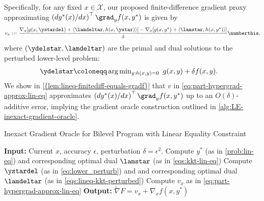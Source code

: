 Specifically, for any fixed $x\in \mathcal{X}$, our proposed finite-difference gradient proxy approximating $\left({d y^*(x)}/{dx}\right)^\top\grad_{y}f(x,y^{*})$ is given
by
 \[ v_x := {\frac{\nabla_{x}[g(x,\ystardel)+\langle\lamdeltar, h(x,\ystar)\rangle]-\nabla_{x}[g(x,y^{*})+\langle\lamstar, h(x,y^{*})\rangle]}{\delta}
 \numberthis\label{eq:part-hypergrad-approx-lin-eq},}\]
where $(\ydelstar,\lamdeltar)$ are the primal and dual solutions to the
 perturbed lower-level problem:
\begin{align}\label{eq:lower_perturb}
    & \ydelstar \coloneqq \arg\min\nolimits_{y: h(x,y) = 0} ~g(x,y)+\delta f(x,y).
\end{align} We show in \cref{{lem:lineq-finitediff-equals-gradf}} that $v$ in \cref{eq:part-hypergrad-approx-lin-eq} approximates $\left({d y^*(x)}/{dx}\right)^\top\grad_{y}f(x,y^{*})$ up to an $O(\delta)$-additive error, implying the gradient oracle construction outlined in 
\cref{alg:LE-inexact-gradient-oracle}.

\begin{algorithm}[h]\caption{Inexact Gradient Oracle for Bilevel Program with Linear Equality Constraint}\label{alg:LE-inexact-gradient-oracle}
\begin{algorithmic}[1]
\State \textbf{Input:}
Current $x$, accuracy $\epsilon$, perturbation $\delta = \epsilon^2$.
\State Compute $y^*$ (as in \cref{prob:lin-eq}) and corresponding optimal dual $\lamstar$ (as in \cref{eqs:kkt-lin-eq})\label{line:LEQ-first}
\State Compute $\ystardel$ (as in \cref{eq:lower_perturb}) and and corresponding optimal dual $\lamdeltar$ (as in \cref{eqs:lineq-kkt-perturbed}) \label{line:LEQ-second} 
\State Compute $v_x$ as in \cref{eq:part-hypergrad-approx-lin-eq} 
\State \textbf{Output:} $\widetilde{\nabla} F = v_x + \nabla_x f(x, y^*)$
\end{algorithmic}
\end{algorithm}

